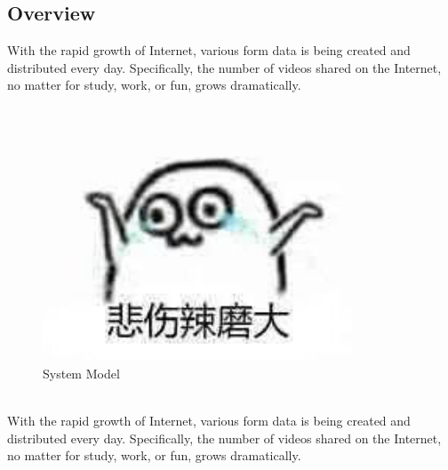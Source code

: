 \documentclass[a4paper,12pt,UTF8]{ctexart}
\begin{document}
\begin{spacing}{1.1}
\subsection{Overview}
With the rapid growth of Internet, various form data is being created and distributed every day. Specifically, the number of videos shared on the Internet, no matter for study, work, or fun, grows dramatically. 
\begin{figure}[h]
	\centering
	\includegraphics[width=0.82\textwidth]{systemmodel}
	\caption{System Model}
	\label{systemmodel}
\end{figure}
\\\indent With the rapid growth of Internet, various form data is being created and distributed every day. Specifically, the number of videos shared on the Internet, no matter for study, work, or fun, grows dramatically. 


\end{spacing}
\end{document}
